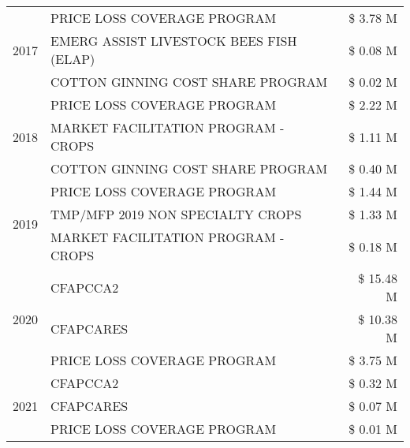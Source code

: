 \begin{tabular}{llr}
\cline{1-3}
\multirow[t]{3}{*}{2017} & PRICE LOSS COVERAGE PROGRAM & \$ 3.78 M \\
 & EMERG ASSIST LIVESTOCK BEES FISH (ELAP) & \$ 0.08 M \\
 & COTTON GINNING COST SHARE PROGRAM & \$ 0.02 M \\
\cline{1-3}
\multirow[t]{3}{*}{2018} & PRICE LOSS COVERAGE PROGRAM & \$ 2.22 M \\
 & MARKET FACILITATION PROGRAM - CROPS & \$ 1.11 M \\
 & COTTON GINNING COST SHARE PROGRAM & \$ 0.40 M \\
\cline{1-3}
\multirow[t]{3}{*}{2019} & PRICE LOSS COVERAGE PROGRAM & \$ 1.44 M \\
 & TMP/MFP 2019 NON SPECIALTY CROPS & \$ 1.33 M \\
 & MARKET FACILITATION PROGRAM - CROPS & \$ 0.18 M \\
\cline{1-3}
\multirow[t]{3}{*}{2020} & CFAPCCA2 & \$ 15.48 M \\
 & CFAPCARES & \$ 10.38 M \\
 & PRICE LOSS COVERAGE PROGRAM & \$ 3.75 M \\
\cline{1-3}
\multirow[t]{3}{*}{2021} & CFAPCCA2 & \$ 0.32 M \\
 & CFAPCARES & \$ 0.07 M \\
 & PRICE LOSS COVERAGE PROGRAM & \$ 0.01 M \\
\cline{1-3}
\bottomrule
\end{tabular}
